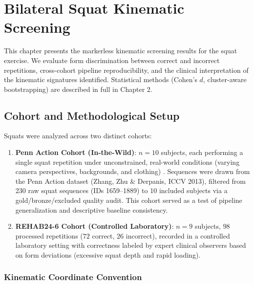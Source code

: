 \chapter{Bilateral Squat Kinematic Screening}
\label{ch:squat}



This chapter presents the markerless kinematic screening results for the squat exercise. We evaluate form discrimination between correct and incorrect repetitions, cross-cohort pipeline reproducibility, and the clinical interpretation of the kinematic signatures identified. Statistical methods (Cohen's $d$, cluster-aware bootstrapping) are described in full in Chapter 2.



\section{Cohort and Methodological Setup}
\label{sec:4-1-cohort-and-methodological-setup}


Squats were analyzed across two distinct cohorts:

\begin{enumerate}
  \item \textbf{Penn Action Cohort (In-the-Wild)}: $n = 10$ subjects, each performing a single squat repetition under unconstrained, real-world conditions (varying camera perspectives, backgrounds, and clothing) \citep{Zhang_Penn_Action_2013}. Sequences were drawn from the Penn Action dataset (Zhang, Zhu \& Derpanis, ICCV 2013), filtered from 230 raw squat sequences (IDs 1659–1889) to 10 included subjects via a gold/bronze/excluded quality audit. This cohort served as a test of pipeline generalization and descriptive baseline consistency.
  \item \textbf{REHAB24-6 Cohort (Controlled Laboratory)}: $n = 9$ subjects, $98$ processed repetitions ($72$ correct, $26$ incorrect), recorded in a controlled laboratory setting with correctness labeled by expert clinical observers based on form deviations (excessive squat depth and rapid loading).
\end{enumerate}

\subsection{Kinematic Coordinate Convention}
\label{sec:4-1-1-kinematic-coordinate-convention}


